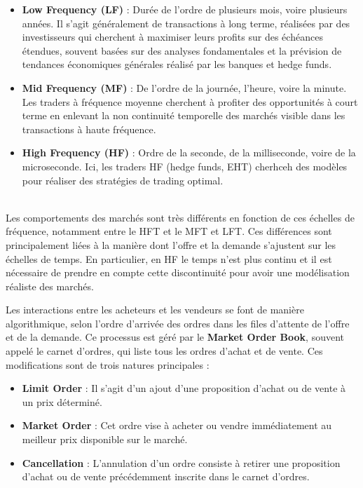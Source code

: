 \documentclass[12pt,a4paper]{article}
\theoremstyle{definition}
\theoremstyle{remark}
\begin{document}
    \begin{itemize}
        \item \textbf{Low Frequency (LF)} : Durée de l'ordre de plusieurs mois, voire plusieurs années. Il s'agit généralement de transactions à long terme, réalisées par des investisseurs qui cherchent à maximiser leurs profits sur des échéances étendues, souvent basées sur des analyses fondamentales et la prévision de tendances économiques générales réalisé par les banques et hedge funds.

        \item \textbf{Mid Frequency (MF)} : De l'ordre de la journée, l'heure, voire la minute. Les traders à fréquence moyenne cherchent à profiter des opportunités à court terme en enlevant la non continuité temporelle des marchés visible dans les transactions à haute fréquence. 

        \item \textbf{High Frequency (HF)} : Ordre de la seconde, de la milliseconde, voire de la microseconde. Ici, les traders HF (hedge funds, EHT) cherhceh des modèles pour réaliser des stratégies de trading optimal.
    \end{itemize}
    \\
    Les comportements des marchés sont très différents en fonction de ces échelles de fréquence, notamment entre le HFT et le MFT et LFT. Ces différences sont principalement liées à la manière dont l'offre et la demande s'ajustent sur les échelles de temps. En particulier, en HF le temps n'est plus continu et il est nécessaire de prendre en compte cette discontinuité pour avoir une modélisation réaliste des marchés. 

    Les interactions entre les acheteurs et les vendeurs se font de manière algorithmique, selon l'ordre d'arrivée des ordres dans les files d'attente de l'offre et de la demande. Ce processus est géré par le \textbf{Market Order Book}, souvent appelé le carnet d'ordres, qui liste tous les ordres d'achat et de vente. Ces modifications sont de trois natures principales :

    \begin{itemize}
        \item \textbf{Limit Order} : Il s'agit d'un ajout d'une proposition d'achat ou de vente à un prix déterminé. 

        \item \textbf{Market Order} : Cet ordre vise à acheter ou vendre immédiatement au meilleur prix disponible sur le marché. 

        \item \textbf{Cancellation} : L'annulation d'un ordre consiste à retirer une proposition d'achat ou de vente précédemment inscrite dans le carnet d'ordres.
    \end{itemize}
\end{document}
